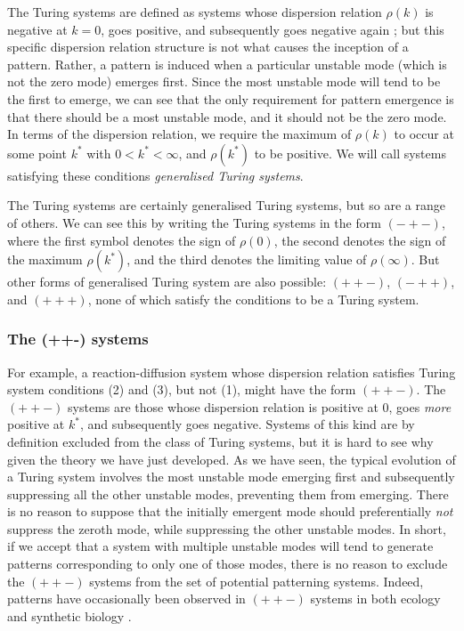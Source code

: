 The Turing systems are defined as systems whose dispersion relation $\rho(k)$ is negative at $k=0$, goes positive, and subsequently goes negative again \cite{murray2001mathematical}; but this specific dispersion relation structure is not what causes the inception of a pattern. Rather, a pattern is induced when a particular unstable mode (which is not the zero mode) emerges first. Since the most unstable mode will tend to be the first to emerge, we can see that the only requirement for pattern emergence is that there should be a most unstable mode, and it should not be the zero mode. In terms of the dispersion relation, we require the maximum of $\rho(k)$ to occur at some point $k^*$ with $0<k^*<\infty$, and $\rho(k^*)$ to be positive. We will call systems satisfying these conditions \emph{generalised Turing systems}.

The Turing systems are certainly generalised Turing systems, but so are a range of others. We can see this by writing the Turing systems in the form $(-+-)$, where the first symbol denotes the sign of $\rho(0)$, the second denotes the sign of the maximum $\rho(k^*)$, and the third denotes the limiting value of $\rho(\infty)$. But other forms of generalised Turing system are also possible: $(++-)$, $(-++)$, and $(+++)$, none of which satisfy the conditions to be a Turing system.

\subsubsection*{The (++-) systems}

For example, a reaction-diffusion system whose dispersion relation satisfies Turing system conditions (2) and (3), but not (1), might have the form $(++-)$. The $(++-)$ systems are those whose dispersion relation is positive at $0$, goes \emph{more} positive at $k^*$, and subsequently goes negative. Systems of this kind are by definition excluded from the class of Turing systems, but it is hard to see why given the theory we have just developed. As we have seen, the typical evolution of a Turing system involves the most unstable mode emerging first and subsequently suppressing all the other unstable modes, preventing them from emerging. There is no reason to suppose that the initially emergent mode should preferentially \emph{not} suppress the zeroth mode, while suppressing the other unstable modes. In short, if we accept that a system with multiple unstable modes will tend to generate patterns corresponding to only one of those modes, there is no reason to exclude the $(++-)$ systems from the set of potential patterning systems. Indeed, patterns have occasionally been observed in $(++-)$ systems in both ecology \cite{baurmann2007instabilities} and synthetic biology \cite{borek2016turing}.

